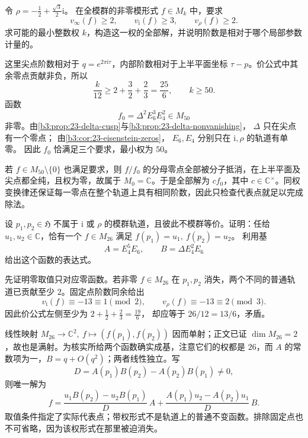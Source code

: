 \begin{exercise}\label{b3:ex:23-2}
令 \(\rho=-\tfrac12+\tfrac{\sqrt3}{2}\mathrm{i}\)。
在全模群的非零模形式 \(f\in M_k\) 中，要求
\[
v_\infty(f)\ge2,\qquad v_{\mathrm{i}}(f)\ge3,\qquad v_\rho(f)\ge2.
\]
求可能的最小整数权 \(k\)，构造这一权的全部解，并说明阶数是相对于哪个局部参数计量的。
\end{exercise}
\begin{solution}
这里尖点阶数相对于 \(q=e^{2\pi\mathrm{i}\tau}\)，内部阶数相对于上半平面坐标 \(\tau-p\)。价公式中其余零点贡献非负，所以
\[
\frac{k}{12}\ge2+\frac32+\frac23=\frac{25}{6},
\qquad k\ge50.
\]
函数
\[
f_0=\Delta^2E_6^3E_4^2\in M_{50}
\]
非零。由\cref{b3:prop:23-delta-cusp}与\cref{b3:prop:23-delta-nonvanishing}，
\(\Delta\) 只在尖点有一个零点；
由\cref{b3:cor:23-eisenstein-zeros}，
\(E_6,E_4\) 分别只在 \(\mathrm{i},\rho\) 的轨道有单零。
因此 \(f_0\) 恰满足三个要求，最小权为 \(50\)。

若 \(f\in M_{50}\setminus\{0\}\) 也满足要求，则 \(f/f_0\) 的分母零点全部被分子抵消，在上半平面及尖点都全纯，且权为零，故属于 \(M_0=\mathbb C\)。于是全部解为 \(cf_0\)，其中 \(c\in\mathbb C^\times\)。同权变换律还保证每一零点在整个轨道上具有相同阶数，因此只检查代表点就足以完成除法。
\end{solution}

\begin{exercise}\label{b3:ex:23-3}
设 \(p_1,p_2\in\mathfrak H\) 不属于 \(\mathrm{i}\) 或 \(\rho\) 的模群轨道，且彼此不模群等价。证明：任给 \(u_1,u_2\in\mathbb C\)，恰有一个 \(f\in M_{26}\) 满足 \(f(p_1)=u_1,\ f(p_2)=u_2\)。
利用基
\[
A=E_4^5E_6,\qquad B=\Delta E_4^2E_6
\]
给出这个函数的表达式。
\end{exercise}
\begin{solution}
先证明零取值只对应零函数。若非零 \(f\in M_{26}\) 在 \(p_1,p_2\) 消失，两个不同的普通轨道已贡献至少 \(2\)。固定点阶数同余给出
\[
v_{\mathrm{i}}(f)\equiv-13\equiv1\pmod2,\qquad
v_\rho(f)\equiv-13\equiv2\pmod3.
\]
因此价公式左侧至少为 \(2+\tfrac12+\tfrac23=\tfrac{19}{6}\)，
却应等于 \(26/12=13/6\)，矛盾。

线性映射 \(M_{26}\to\mathbb C^2,\ f\mapsto(f(p_1),f(p_2))\) 因而单射；正文已证 \(\dim M_{26}=2\)，故也是满射。为核实所给两个函数确实成基，注意它们的权都是 \(26\)，而 \(A\) 的常数项为一，\(B=q+O(q^2)\)；两者线性独立。写
\[
D=A(p_1)B(p_2)-A(p_2)B(p_1)\ne0,
\]
则唯一解为
\[
f=
\frac{u_1B(p_2)-u_2B(p_1)}{D}\,A
+\frac{A(p_1)u_2-A(p_2)u_1}{D}\,B.
\]
取值条件指定了实际代表点；带权形式不是轨道上的普通不变函数。排除固定点也不可省略，因为该权形式在那里被迫消失。
\end{solution}

